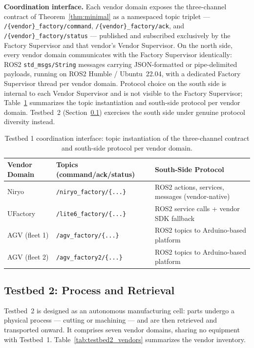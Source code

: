 \documentclass[a4paper,fleqn]{cas-dc}
\begin{document}
\textbf{Coordination interface.} Each vendor domain exposes the three-channel contract of Theorem~\ref{thm:minimal} as a namespaced topic triplet --- \texttt{/\{vendor\}\_factory/command}, \texttt{/\{vendor\}\_factory/ack}, and \texttt{/\{vendor\}\_factory/status} --- published and subscribed exclusively by the Factory Supervisor and that vendor's Vendor Supervisor. On the north side, every vendor domain communicates with the Factory Supervisor identically: ROS2 \texttt{std\_msgs/String} messages carrying JSON-formatted or pipe-delimited payloads, running on ROS2 Humble / Ubuntu~22.04, with a dedicated Factory Supervisor thread per vendor domain. Protocol choice on the south side is internal to each Vendor Supervisor and is not visible to the Factory Supervisor; Table~\ref{tab:testbed1_coord} summarizes the topic instantiation and south-side protocol per vendor domain. Testbed~2 (Section~\ref{sec:testbed2}) exercises the south side under genuine protocol diversity instead.

\begin{table}[h]
\centering
\caption{Testbed 1 coordination interface: topic instantiation of the three-channel contract and south-side protocol per vendor domain.}
\label{tab:testbed1_coord}
\begin{tabular}{lll}
\toprule
\textbf{Vendor Domain} & \textbf{Topics (command/ack/status)} & \textbf{South-Side Protocol} \\
\midrule
Niryo & \texttt{/niryo\_factory/\{...\}} & ROS2 actions, services, messages (vendor-native) \\
UFactory & \texttt{/lite6\_factory/\{...\}} & ROS2 service calls + vendor SDK fallback \\
AGV (fleet 1) & \texttt{/agv\_factory/\{...\}} & ROS2 topics to Arduino-based platform \\
AGV (fleet 2) & \texttt{/agv\_factory2/\{...\}} & ROS2 topics to Arduino-based platform \\
\bottomrule
\end{tabular}
\end{table}

\subsection{Testbed 2: Process and Retrieval}
\label{sec:testbed2}

Testbed~2 is designed as an autonomous manufacturing cell: parts undergo a physical process --- cutting or machining --- and are then retrieved and transported onward. It comprises seven vendor domains, sharing no equipment with Testbed~1. Table~\ref{tab:testbed2_vendors} summarizes the vendor inventory.
\end{document}
